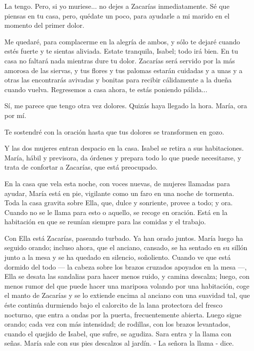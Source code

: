 \documentclass[12pt, twoside, openright]{book} %
\begin{document}
La tengo. Pero, si yo muriese... no dejes a Zacarías inmediatamente. Sé que piensas en tu casa, pero, quédate un poco, para ayudarle a mi marido en el momento del primer dolor. 

Me quedaré, para complacerme en la alegría de ambos, y sólo te dejaré cuando estés fuerte y te sientas aliviada. Estate tranquila, Isabel; todo irá bien. En tu casa no faltará nada mientras dure tu dolor. Zacarías será servido por la más amorosa de las siervas, y tus flores y tus palomas estarán cuidadas y a unas y a otras las encontrarás avivadas y bonitas para recibir cálidamente a la dueña cuando vuelva. Regresemos a casa ahora, te estás poniendo pálida... 

Sí, me parece que tengo otra vez dolores. Quizás haya llegado la hora. María, ora por mí. 

Te sostendré con la oración hasta que tus dolores se transformen en gozo. 

Y las dos mujeres entran despacio en la casa. Isabel se retira a sus habitaciones. María, hábil y previsora, da órdenes y prepara todo lo que puede necesitarse, y trata de confortar a Zacarías, que está preocupado. 

En la casa que vela esta noche, con voces nuevas, de mujeres llamadas para ayudar, María está en pie, vigilante como un faro en una noche de tormenta. Toda la casa gravita sobre Ella, que, dulce y sonriente, provee a todo; y ora. Cuando no se le llama para esto o aquello, se recoge en oración. Está en la habitación en que se reunían siempre para las comidas y el trabajo. 

Con Ella está Zacarías, paseando turbado. Ya han orado juntos. María luego ha seguido orando; incluso ahora, que el anciano, cansado, se ha sentado en su sillón junto a la mesa y se ha quedado en silencio, soñoliento. Cuando ve que está dormido del todo — la cabeza sobre los brazos cruzados apoyados en la mesa —, Ella se desata las sandalias para hacer menos ruido, y camina descalza; luego, con menos rumor del que puede hacer una mariposa volando por una habitación, coge el manto de Zacarías y se lo extiende encima al anciano con una suavidad tal, que éste continúa durmiendo bajo el calorcito de la lana protectora del fresco nocturno, que entra a ondas por la puerta, frecuentemente abierta. Luego sigue orando; cada vez con más intensidad; de rodillas, con los brazos levantados, cuando el quejido de Isabel, que sufre, se agudiza. Sara entra y la llama con señas. María sale con sus pies descalzos al jardín. - La señora la llama - dice. 
\end{document}

